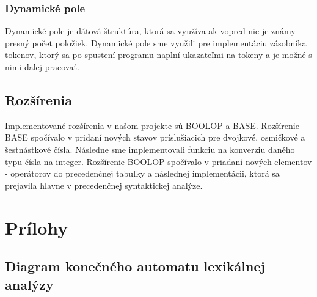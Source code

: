 \documentclass[a4paper, 12pt]{article}
\begin{document}
\subsubsection{Dynamické pole}
Dynamické pole je dátová štruktúra, ktorá sa využíva ak vopred nie je známy presný počet položiek. Dynamické pole sme využili pre implementáciu zásobníka tokenov, ktorý sa po spustení programu naplní ukazateľmi na tokeny a je možné s nimi ďalej pracovať.

\bigskip
\bigskip
\subsection{Rozšírenia} \label{extensions}
Implementované rozšírenia v našom projekte sú BOOLOP a BASE. Rozšírenie BASE spočívalo v pridaní nových stavov príslušiacich pre dvojkové, osmičkové a šestnástkové čísla. Následne sme implementovali funkciu na konverziu daného typu čísla na integer. Rozšírenie BOOLOP spočívalo v priadaní nových elementov - operátorov do precedenčnej tabuľky a následnej implementácii, ktorá sa prejavila hlavne v precedenčnej syntaktickej analýze.

\newpage

\section{Prílohy} \label{prilohy}

\renewcommand\thesubsection{\thesection.\Alph{subsection}}

\subsection{Diagram konečného automatu lexikálnej analýzy \cite{automata}} \label{subsec:automat}
\begin{figure}[ht]
    \begin{center}
    \end{center}
\end{figure}
\end{document}
